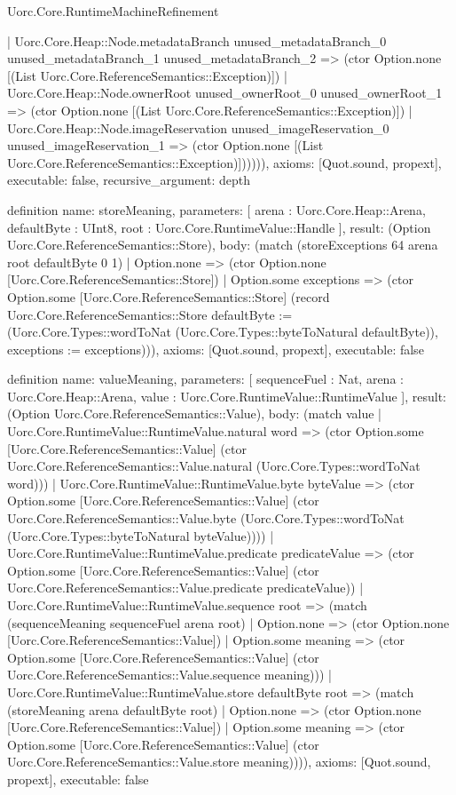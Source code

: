 \begin{lexlean}{Uorc.Core.RuntimeMachineRefinement}
\begin{semanticmodule}
{        | Uorc.Core.Heap::Node.metadataBranch unused_metadataBranch_0 unused_metadataBranch_1 unused_metadataBranch_2 => (ctor Option.none [(List Uorc.Core.ReferenceSemantics::Exception)])
        | Uorc.Core.Heap::Node.ownerRoot unused_ownerRoot_0 unused_ownerRoot_1 => (ctor Option.none [(List Uorc.Core.ReferenceSemantics::Exception)])
        | Uorc.Core.Heap::Node.imageReservation unused_imageReservation_0 unused_imageReservation_1 => (ctor Option.none [(List Uorc.Core.ReferenceSemantics::Exception)]))))),
  axioms: [Quot.sound, propext],
  executable: false,
  recursive_argument: depth
}

definition{
  name: storeMeaning,
  parameters: [
    arena : Uorc.Core.Heap::Arena,
    defaultByte : UInt8,
    root : Uorc.Core.RuntimeValue::Handle
  ],
  result: (Option Uorc.Core.ReferenceSemantics::Store),
  body: (match (storeExceptions 64 arena root defaultByte 0 1)
    | Option.none => (ctor Option.none [Uorc.Core.ReferenceSemantics::Store])
    | Option.some exceptions => (ctor Option.some [Uorc.Core.ReferenceSemantics::Store] (record Uorc.Core.ReferenceSemantics::Store {defaultByte := (Uorc.Core.Types::wordToNat (Uorc.Core.Types::byteToNatural defaultByte)), exceptions := exceptions}))),
  axioms: [Quot.sound, propext],
  executable: false
}

definition{
  name: valueMeaning,
  parameters: [
    sequenceFuel : Nat,
    arena : Uorc.Core.Heap::Arena,
    value : Uorc.Core.RuntimeValue::RuntimeValue
  ],
  result: (Option Uorc.Core.ReferenceSemantics::Value),
  body: (match value
    | Uorc.Core.RuntimeValue::RuntimeValue.natural word => (ctor Option.some [Uorc.Core.ReferenceSemantics::Value] (ctor Uorc.Core.ReferenceSemantics::Value.natural (Uorc.Core.Types::wordToNat word)))
    | Uorc.Core.RuntimeValue::RuntimeValue.byte byteValue => (ctor Option.some [Uorc.Core.ReferenceSemantics::Value] (ctor Uorc.Core.ReferenceSemantics::Value.byte (Uorc.Core.Types::wordToNat (Uorc.Core.Types::byteToNatural byteValue))))
    | Uorc.Core.RuntimeValue::RuntimeValue.predicate predicateValue => (ctor Option.some [Uorc.Core.ReferenceSemantics::Value] (ctor Uorc.Core.ReferenceSemantics::Value.predicate predicateValue))
    | Uorc.Core.RuntimeValue::RuntimeValue.sequence root => (match (sequenceMeaning sequenceFuel arena root)
      | Option.none => (ctor Option.none [Uorc.Core.ReferenceSemantics::Value])
      | Option.some meaning => (ctor Option.some [Uorc.Core.ReferenceSemantics::Value] (ctor Uorc.Core.ReferenceSemantics::Value.sequence meaning)))
    | Uorc.Core.RuntimeValue::RuntimeValue.store defaultByte root => (match (storeMeaning arena defaultByte root)
      | Option.none => (ctor Option.none [Uorc.Core.ReferenceSemantics::Value])
      | Option.some meaning => (ctor Option.some [Uorc.Core.ReferenceSemantics::Value] (ctor Uorc.Core.ReferenceSemantics::Value.store meaning)))),
  axioms: [Quot.sound, propext],
  executable: false
}


\end{semanticmodule}
\end{lexlean}
